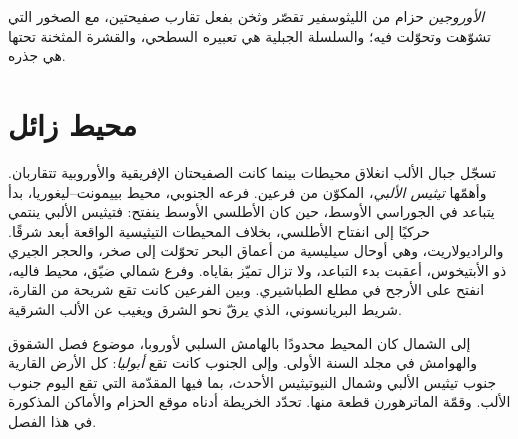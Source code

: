 \begin{definition}[الأوروجين]\label{def:b2:alpine-orogen:orogen}
\emph{الأوروجين} حزام من الليثوسفير تقصّر وثخن بفعل
تقارب صفيحتين، مع الصخور التي تشوّهت وتحوّلت فيه؛ والسلسلة
الجبلية هي تعبيره السطحي، والقشرة المثخنة تحتها هي جذره.
\end{definition}

\section{محيط زائل}\label{sec:b2:alpine-orogen:tethys}

تسجّل جبال الألب انغلاق محيطات بينما كانت الصفيحتان الإفريقية والأوروبية تتقاربان.
وأهمّها \emph{تيثيس الألبي}، المكوّن من فرعين. فرعه الجنوبي، محيط
بييمونت--ليغوريا، بدأ يتباعد في الجوراسي الأوسط، حين كان الأطلسي الأوسط
ينفتح: فتيثيس الألبي ينتمي حركيًا إلى انفتاح الأطلسي، بخلاف
المحيطات التيثيسية الواقعة أبعد شرقًا. والراديولاريت، وهي أوحال سيليسية من أعماق البحر تحوّلت إلى صخر،
والحجر الجيري ذو الأبتيخوس، أعقبت بدء التباعد، ولا تزال تميّز
بقاياه. وفرع شمالي ضيّق، محيط فاليه، انفتح على الأرجح في مطلع
الطباشيري. وبين الفرعين كانت تقع شريحة من القارة، شريط البريانسوني، الذي يرقّ
نحو الشرق ويغيب عن الألب الشرقية.

إلى الشمال كان المحيط محدودًا بالهامش السلبي لأوروبا، موضوع فصل الشقوق
والهوامش في مجلد السنة الأولى. وإلى الجنوب كانت تقع \emph{أبوليا}: كل الأرض
القارية جنوب تيثيس الألبي وشمال النيوتيثيس الأحدث، بما فيها المقدّمة
التي تقع اليوم جنوب الألب. وقمّة الماترهورن قطعة منها.
تحدّد الخريطة أدناه موقع الحزام والأماكن المذكورة في هذا الفصل.

